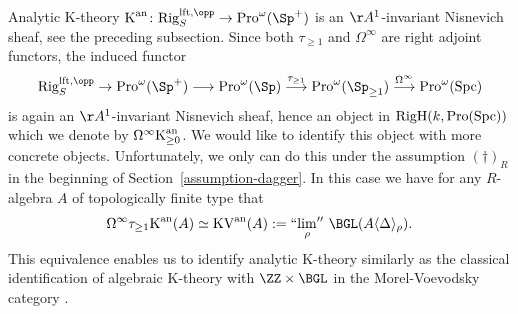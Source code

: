 \documentclass[colorinlistoftodos,article,11pt,reqno]{article}
\newcommand{\RigH}{\textup{RigH}}
\newcommand{\Rig}{\textup{Rig}}
\newcommand{\Pro}{\textup{Pro}}
\newcommand{\Spc}{\textup{Spc}}
\newcommand{\lft}{\textup{lft}}
\newcommand{\K}{\textup{K}}
\newcommand{\Kan}{\K^\textup{an}}
\newcommand{\KVan}{\textup{KV}^\textup{an}}
\newcommand{\Arig}{\AA^{1}}
\newcommand{\skp}[1]{\langle #1 \rangle}
\renewcommand{\to}[1][]{\overset{#1}{\rightarrow}}
\newcommand{\To}[1][]{\overset{#1}{\longrightarrow}}
\DeclareMathOperator*{\prolim}{``lim''}
\begin{document}
Analytic K-theory $\Kan\colon\Rig_S^{\lft,\opp}\to\Pro^\omega(\Sp^+)$ is an $\Arig$-invariant Nisnevich sheaf, see the preceding subsection. Since both $\tau_{\geq 1}$ and $\Omega^\infty$ are right adjoint functors, the induced functor 
\[ \Rig_S^{\lft,\opp}\to\Pro^\omega(\Sp^+) \To \Pro^\omega(\Sp) \To[\tau_{\geq 1}] \Pro^\omega(\Sp_{\geq 1}) \To[\Omega^\infty] \Pro^\omega(\Spc) \]
is again an $\Arig$-invariant Nisnevich sheaf, hence an object in $\RigH(k,\Pro(\Spc))$ which we denote by $\Omega^\infty\Kan_{\geq 0}$. We would like to identify this object with more concrete objects. Unfortunately, we only can do this under the assumption $(\dagger)_{R}$ in the beginning of Section~\ref{assumption-dagger}. In this case we have for any $R$-algebra $A$ of topologically finite type that \cite[Lem.~7.5]{kst-i}
\[
\Omega^\infty\tau_{\geq 1}\Kan(A) \simeq \KVan(A) := \prolim_\rho\, \BGL(A\skp{\Delta}_\rho).
\]
This equivalence enables us to identify analytic K-theory similarly as the classical identification of algebraic K-theory with $\ZZ\times\BGL$ in the Morel-Voevodsky category \cite[Prop.~3.10]{MV1}.
\end{document}

